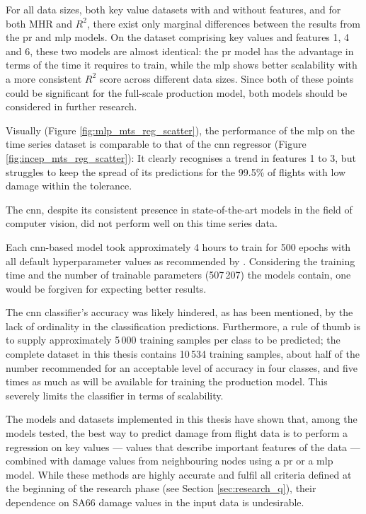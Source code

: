 For all data sizes, both key value datasets with and without features, and for both MHR and \(R^2\), there exist only marginal differences between the results from the \ac{pr} and \ac{mlp} models. On the dataset comprising key values and features 1, 4 and 6, these two models are almost identical: the \ac{pr} model has the advantage in terms of the time it requires to train, while the \ac{mlp} shows better scalability with a more consistent \(R^2\) score across different data sizes. Since both of these points could be significant for the full-scale production model, both models should be considered in further research.

Visually (Figure \ref{fig:mlp_mts_reg_scatter}), the performance of the \ac{mlp} on the time series dataset is comparable to that of the \ac{cnn} regressor (Figure \ref{fig:incep_mts_reg_scatter}): It clearly recognises a trend in features 1 to 3, but struggles to keep the spread of its predictions for the 99.5\% of flights with low damage within the tolerance. %

The \ac{cnn}, despite its consistent presence in state-of-the-art models in the field of computer vision, did not perform well on this time series data.

Each \ac{cnn}-based model took approximately 4 hours to train for 500 epochs with all default hyperparameter values as recommended by \citet[]{fawaz_inceptiontime_2019}. Considering the training time and the number of trainable parameters (507\,207) the models contain, one would be forgiven for expecting better results.

The \ac{cnn} classifier's accuracy was likely hindered, as has been mentioned, by the lack of ordinality in the classification predictions. Furthermore, a rule of thumb \cite[]{goodfellow_deep_2016} is to supply approximately 5\,000 training samples per class to be predicted; the complete dataset in this thesis contains 10\,534 training samples, about half of the number recommended for an acceptable level of accuracy in four classes, and five times as much as will be available for training the production model. This severely limits the classifier in terms of scalability.

The models and datasets implemented in this thesis have shown that, among the models tested, the best way to predict damage from flight data is to perform a regression on key values --- values that describe important features of the data --- combined with damage values from neighbouring nodes using a \ac{pr} or a \ac{mlp} model. While these methods are highly accurate and fulfil all criteria defined at the beginning of the research phase (see Section \ref{sec:research_q}), their dependence on SA66 damage values in the input data is undesirable.

